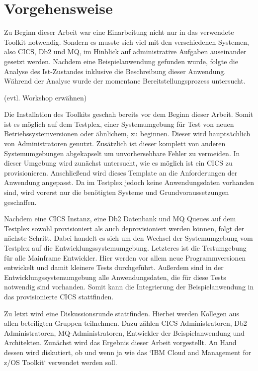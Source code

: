 \chapter{Vorgehensweise}\label{ch:vorgehensweise}
Zu Beginn dieser Arbeit war eine Einarbeitung nicht nur in das verwendete Toolkit notwendig.
Sondern es musste sich viel mit den verschiedenen Systemen, also CICS, Db2 und MQ, im Hinblick auf administrative Aufgaben auseinander gesetzt werden.
Nachdem eine Beispielanwendung gefunden wurde, folgte die Analyse des Ist-Zustandes inklusive die Beschreibung dieser Anwendung.
Während der Analyse wurde der momentane Bereitstellungsprozess untersucht.

(evtl. Workshop erwähnen)

Die Installation des Toolkits geschah bereits vor dem Beginn dieser Arbeit.
Somit ist es möglich auf dem Testplex, einer Systemumgebung für Test von neuen Betriebssystemversionen oder ähnlichem, zu beginnen.
Dieser wird hauptsächlich von Administratoren genutzt.
Zusätzlich ist dieser komplett von anderen Systemumgebungen abgekapselt um unvorhersehbare Fehler zu vermeiden.
In dieser Umgebung wird zunächst untersucht, wie es möglich ist ein CICS zu provisionieren.
Anschließend wird dieses Template an die Anforderungen der Anwendung angepasst.
Da im Testplex jedoch keine Anwendungsdaten vorhanden sind, wird vorerst nur die benötigten Systeme und Grundvoraussetzungen geschaffen.

Nachdem eine CICS Instanz, eine Db2 Datenbank und MQ Queues auf dem Testplex sowohl provisioniert als auch deprovisioniert werden können, folgt der nächste Schritt.
Dabei handelt es sich um den Wechsel der Systemumgebung vom Testplex auf die Entwicklungssystemumgebung.
Letzteres ist die Testumgebung für alle Mainframe Entwickler.
Hier werden vor allem neue Programmversionen entwickelt und damit kleinere Tests durchgeführt.
Außerdem sind in der Entwicklungssystemumgebung alle Anwendungsdaten, die für diese Tests notwendig sind vorhanden.
Somit kann die Integrierung der Beispielanwendung in das provisionierte CICS stattfinden.

Zu letzt wird eine Diskussionsrunde stattfinden.
Hierbei werden Kollegen aus allen beteiligten Gruppen teilnehmen.
Dazu zählen CICS-Administratoren, Db2-Administratoren, MQ-Administratoren, Entwickler der Beispielanwendung und Architekten.
Zunächst wird das Ergebnis dieser Arbeit vorgestellt.
An Hand dessen wird diskutiert, ob und wenn ja wie das `IBM Cloud and Management for z/OS Toolkit` verwendet werden soll.